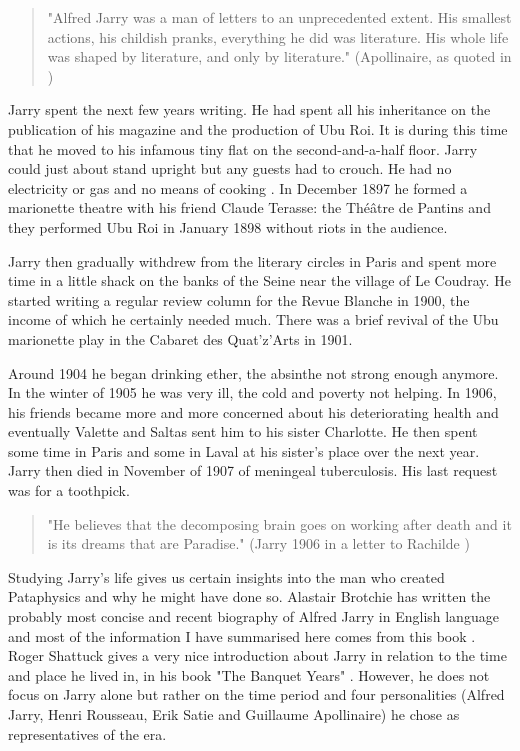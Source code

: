 \begin{quote}
  "Alfred Jarry was a man of letters to an unprecedented extent. His smallest actions, his childish pranks, everything he did was literature. His whole life was shaped by literature, and only by literature." (Apollinaire, as quoted in \citep[p.307]{Brotchie2011})
\end{quote}

Jarry spent the next few years writing. He had spent all his inheritance on the publication of his magazine and the production of Ubu Roi. It is during this time that he moved to his infamous tiny flat on the second-and-a-half floor. Jarry could just about stand upright but any guests had to crouch. He had no electricity or gas and no means of cooking \citep[p.195]{Brotchie2011}. In December 1897 he formed a marionette theatre with his friend Claude Terasse: the Théâtre de Pantins and they performed Ubu Roi in January 1898 without riots in the audience.

Jarry then gradually withdrew from the literary circles in Paris and spent more time in a little shack on the banks of the Seine near the village of Le Coudray. He started writing a regular review column for the Revue Blanche in 1900, the income of which he certainly needed much. There was a brief revival of the Ubu marionette play in the Cabaret des Quat'z'Arts in 1901.

Around 1904 he began drinking ether, the absinthe not strong enough anymore. In the winter of 1905 he was very ill, the cold and poverty not helping. In 1906, his friends became more and more concerned about his deteriorating health and eventually Valette and Saltas sent him to his sister Charlotte. He then spent some time in Paris and some in Laval at his sister's place over the next year. Jarry then died in November of 1907 of meningeal tuberculosis. His last request was for a toothpick.

\begin{quote}
  "He believes that the decomposing brain goes on working after death and it is its dreams that are Paradise." (Jarry 1906 in a letter to Rachilde \citep{Brotchie2007})
\end{quote}

Studying Jarry's life gives us certain insights into the man who created Pataphysics and why he might have done so. Alastair Brotchie has written the probably most concise and recent biography of Alfred Jarry in English language and most of the information I have summarised here comes from this book \citep{Brotchie2011}. Roger Shattuck gives a very nice introduction about Jarry in relation to the time and place he lived in, in his book "The Banquet Years" \citep{Shattuck1959}. However, he does not focus on Jarry alone but rather on the time period and four personalities (Alfred Jarry, Henri Rousseau, Erik Satie and Guillaume Apollinaire) he chose as representatives of the era.

